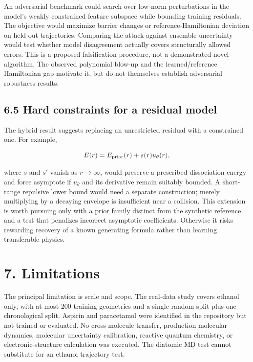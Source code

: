 \documentclass[
  11pt,
  a4paper,
]{article}
\begin{document}
An adversarial benchmark could search over low-norm perturbations in the
model's weakly constrained feature subspace while bounding training
residuals. The objective would maximize barrier changes or
reference-Hamiltonian deviation on held-out trajectories. Comparing the
attack against ensemble uncertainty would test whether model
disagreement actually covers structurally allowed errors. This is a
proposed falsification procedure, not a demonstrated novel algorithm.
The observed polynomial blow-up and the learned/reference Hamiltonian
gap motivate it, but do not themselves establish adversarial robustness
results.

\hypertarget{hard-constraints-for-a-residual-model}{%
\subsection{6.5 Hard constraints for a residual
model}\label{hard-constraints-for-a-residual-model}}

The hybrid result suggests replacing an unrestricted residual with a
constrained one. For example,

\[E(r)=E_{\rm prior}(r)+s(r)u_\theta(r),\]

where \(s\) and \(s'\) vanish as \(r\rightarrow\infty\), would preserve
a prescribed dissociation energy and force asymptote if \(u_\theta\) and
its derivative remain suitably bounded. A short-range repulsive lower
bound would need a separate construction; merely multiplying by a
decaying envelope is insufficient near a collision. This extension is
worth pursuing only with a prior family distinct from the synthetic
reference and a test that penalizes incorrect asymptotic coefficients.
Otherwise it risks rewarding recovery of a known generating formula
rather than learning transferable physics.

\hypertarget{limitations}{%
\section{7. Limitations}\label{limitations}}

The principal limitation is scale and scope. The real-data study covers
ethanol only, with at most 200 training geometries and a single random
split plus one chronological split. Aspirin and paracetamol were
identified in the repository but not trained or evaluated. No
cross-molecule transfer, production molecular dynamics, molecular
uncertainty calibration, reactive quantum chemistry, or
electronic-structure calculation was executed. The diatomic MD test
cannot substitute for an ethanol trajectory test.
\end{document}
